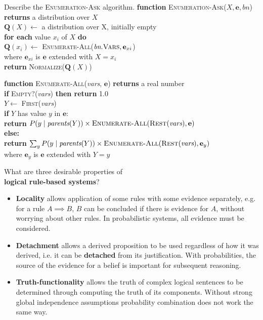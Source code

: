 \begin{flashcard}[Question]{Describe the \textsc{Enumeration-Ask} algorithm.}
\textbf{function} \textsc{Enumeration-Ask}($X, \mathbf{e}, \textit{bn}$) \textbf{returns} a distribution over $X$\\
\-\quad$\mathbf{Q}(X) \gets$ a distribution over X, initially empty\\
\-\quad\textbf{for each} value $x_i$ of $X$ \textbf{do}\\
\-\quad\quad$\mathbf{Q}(x_i) \gets$ \textsc{Enumerate-All}($\textit{bn}.\textsc{Vars}, \mathbf{e}_{xi}$)\\
\-\quad\quad\quad{}where $\mathbf{e}_{xi}$ is $\mathbf{e}$ extended with $X = x_i$\\
\-\quad \textbf{return} \textsc{Normalize}($\mathbf{Q}(X)$)

\medskip

\textbf{function} \textsc{Enumerate-All}(\textit{vars}, $\mathbf{e}$) \textbf{returns} a real number\\
\-\quad\textbf{if} \textsc{Empty?}(\textit{vars}) \textbf{then return} 1.0\\
\-\quad $Y \gets$ \textsc{First}(\textit{vars})\\
\-\quad \textbf{if} $Y$ has value $y$ in $\mathbf{e}$:\\
\-\quad\quad \textbf{return} $P(y \mid \textit{parents}(Y)) \times \textsc{Enumerate-All}(\textsc{Rest}(\textit{vars}), \mathbf{e})$\\
\-\quad \textbf{else:}\\
\-\quad\quad \textbf{return} $\sum_y P(y \mid \textit{parents}(Y)) \times \textsc{Enumerate-All}(\textsc{Rest}(\textit{vars}), \mathbf{e}_y)$\\
\-\quad\quad\quad where $\mathbf{e}_y$ is $\mathbf{e}$ extended with $Y = y$

\end{flashcard}

\begin{flashcard}[Question]{What are three desirable properties of\\\textbf{logical rule-based systems}?}
\begin{itemize}
\item \textbf{Locality} allows application of some rules with some evidence separately, e.g. for a rule $A \implies B$, $B$ can be concluded if there is evidence for $A$, without worrying about other rules. In probabilistic systems, all evidence must be considered.
\item \textbf{Detachment} allows a derived proposition to be used regardless of how it was derived, i.e. it can be \textbf{detached} from its justification. With probabilities, the source of the evidence for a belief is important for subsequent reasoning.
\item \textbf{Truth-functionality} allows the truth of complex logical sentences to be determined through computing the truth of its components. Without strong global independence assumptions probability combination does not work the same way.
\end{itemize}
\end{flashcard}

